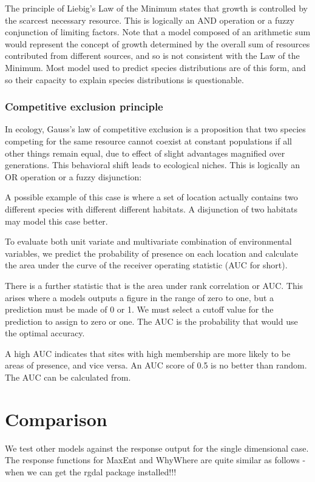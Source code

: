 \documentclass{article}
\newcommand{\pkg}[1]{{\fontseries{b}\selectfont #1}}
\begin{document}
The principle of Liebig's Law of the Minimum states that growth is controlled by the scarcest necessary resource.  This is logically an AND operation or a fuzzy conjunction of limiting factors.  Note that a model composed of an arithmetic sum would represent the concept of growth determined by the overall sum of resources contributed from different sources, and so is not consistent with the Law of the Minimum.  Most model used to predict species distributions are of this form, and so their capacity to explain species distributions is questionable. 


\subsubsection{Competitive exclusion principle}

In ecology, Gauss's law of competitive exclusion is a proposition that two species competing for the same resource cannot coexist at constant populations if all other things remain equal, due to effect of slight advantages magnified over generations.  This behavioral shift leads to ecological niches.  This is logically an OR operation or a fuzzy disjunction:

A possible example of this case is where a set of location actually contains two different species with different different habitats.  A disjunction of two habitats may model this case better.


To evaluate both unit variate and multivariate combination of environmental variables, we predict the probability of presence on each location and calculate the area under the curve of the receiver operating statistic (AUC for short).  

There is a further statistic that is the area under rank correlation or AUC. This arises where a models outputs a figure in the range of zero to one, but a prediction must be made of 0 or 1. We must select a cutoff value for the prediction to assign to zero or one.  The AUC is the probability that would use the optimal accuracy.

A high AUC indicates that sites with high membership are more likely to be areas of presence, and vice versa.  An AUC score of 0.5 is no better than random.  The AUC can be calculated from.

\section{Comparison}

We test other models against the response output for the single dimensional case.  The response functions for MaxEnt and \pkg{WhyWhere} are quite similar as follows - when we can get the rgdal package installed!!!
\end{document}
